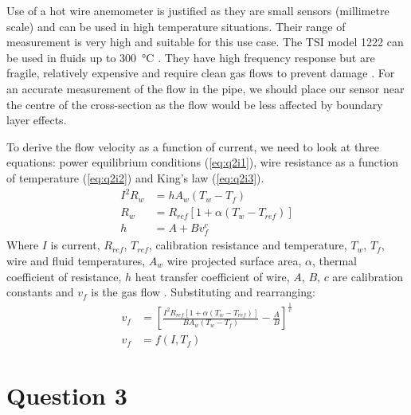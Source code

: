 \documentclass[11pt]{article}
\numberwithin{equation}{section}
\begin{document}
Use of a hot wire anemometer is justified as they are small sensors (millimetre scale) and can be used in high temperature situations. Their range of measurement is very high and suitable for this use case. The TSI model 1222 can be used in fluids up to \SI{300}{\celsius} \cite{b3}. They have high frequency response but are fragile, relatively expensive and require clean gas flows to prevent damage \cite{b3}. For an accurate measurement of the flow in the pipe, we should place our sensor near the centre of the cross-section as the flow would be less affected by boundary layer effects.

To derive the flow velocity as a function of current, we need to look at three equations: power equilibrium conditions (\ref{eq:q2i1}), wire resistance as a function of temperature (\ref{eq:q2i2}) and King's law (\ref{eq:q2i3}). 
\begin{align}
    I^2 R_w &= h A_w \left(T_w - T_f\right)\label{eq:q2i1}\\
    R_w &= R_{ref} \left[1 + \alpha\left(T_w - T_{ref}\right)\right] \label{eq:q2i2}\\
    h &= A + B v_f^c \label{eq:q2i3}
\end{align}
Where $I$ is current, $R_{ref}$, $T_{ref}$, calibration resistance and temperature, $T_w$, $T_f$, wire and fluid temperatures, $A_w$ wire projected surface area, $\alpha$, thermal coefficient of resistance, $h$ heat transfer coefficient of wire, $A$, $B$, $c$ are calibration constants and $v_f$ is the gas flow \cite{b2}. Substituting and rearranging:
\begin{align}
    v_f &= \left[\frac{I^2 R_{ref}\left[1 + \alpha \left(T_w - T_{ref}\right)\right]}{BA_w \left(T_w - T_f\right)}-\frac{A}{B}\right]^{\frac{1}{c}} \label{eq:q2i}\\
    v_f &= f(I, T_f)
\end{align}
\section{Question 3}
\end{document}
